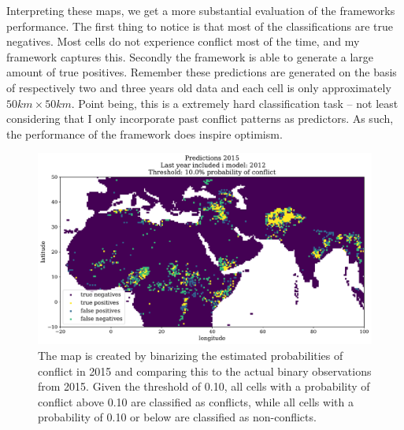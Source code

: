 \documentclass[a4paper]{article}
\begin{document}
Interpreting these maps, we get a more substantial evaluation of the frameworks performance. The first thing to notice is that most of the classifications are true negatives. Most cells do not experience conflict most of the time, and my framework captures this. Secondly the framework is able to generate a large amount of true positives. Remember these predictions are generated on the basis of respectively two and three years old data and each cell is only approximately $50km\times50km$. Point being, this is a extremely hard classification task -- not least considering that I only incorporate past conflict patterns as predictors. As such, the performance of the framework does inspire optimism.\par

\begin{figure}[!htb]
	\centering
	\includegraphics[scale=0.47]{confusion_map_2015.pdf}
    \caption{\footnotesize{The map is created by binarizing the estimated probabilities of conflict in 2015 and comparing this to the actual binary observations from 2015. Given the threshold of 0.10, all cells with a probability of conflict above 0.10 are classified as conflicts, while all cells with a probability of 0.10 or below are classified as non-conflicts.}}\label{confusion_map_2015}
\end{figure}
\end{document}
